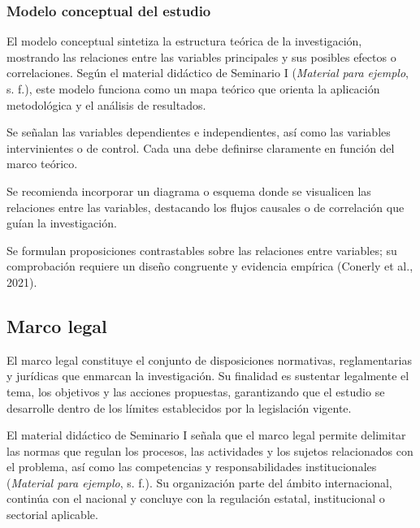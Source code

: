 \subsubsection{Modelo conceptual del estudio}

El modelo conceptual sintetiza la estructura teórica de la investigación, mostrando las relaciones entre las variables principales y sus posibles efectos o correlaciones. Según el material didáctico de Seminario I (\emph{Material para ejemplo}, s. f.), este modelo funciona como un mapa teórico que orienta la aplicación metodológica y el análisis de resultados.


Se señalan las variables dependientes e independientes, así como las variables intervinientes o de control. Cada una debe definirse claramente en función del marco teórico.


Se recomienda incorporar un diagrama o esquema donde se visualicen las relaciones entre las variables, destacando los flujos causales o de correlación que guían la investigación.


Se formulan proposiciones contrastables sobre las relaciones entre variables; su comprobación requiere un diseño congruente y evidencia empírica (Conerly et al., 2021).

\subsection{Marco legal}

El marco legal constituye el conjunto de disposiciones normativas, reglamentarias y jurídicas que enmarcan la investigación. Su finalidad es sustentar legalmente el tema, los objetivos y las acciones propuestas, garantizando que el estudio se desarrolle dentro de los límites establecidos por la legislación vigente.

El material didáctico de Seminario I señala que el marco legal permite delimitar las normas que regulan los procesos, las actividades y los sujetos relacionados con el problema, así como las competencias y responsabilidades institucionales (\emph{Material para ejemplo}, s. f.). Su organización parte del ámbito internacional, continúa con el nacional y concluye con la regulación estatal, institucional o sectorial aplicable.

